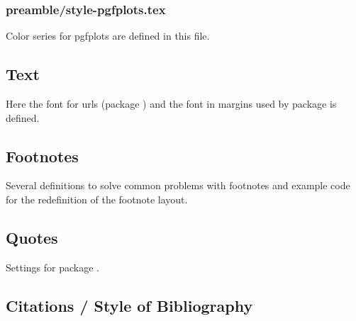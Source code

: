 
\subsubsection{preamble/style-pgfplots.tex}

Color series for pgfplots are defined in this file.


\subsection{Text}
\label{sec:style:text}

Here the font for urls (package ) and the font in margins used by package  is defined.


\subsection{Footnotes}
\label{sec:style:footnote}

Several definitions to solve common problems with footnotes and example code for the redefinition of the footnote layout.


\subsection{Quotes}
\label{sec:style:quotes}

Settings for package .


\subsection{Citations / Style of Bibliography}
\label{sec:style:bib}

